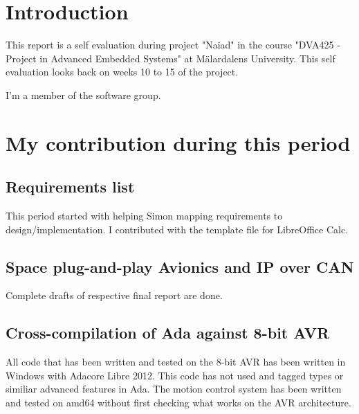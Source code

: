 \section{Introduction}
This report is a self evaluation during project "Naiad" in the course
"DVA425 - Project in Advanced Embedded Systems" at M\"{a}lardalens University.
This self evaluation looks back on weeks 10 to 15 of the project.

I'm a member of the software group.

\section{My contribution during this period}

\subsection{Requirements list}
This period started with helping Simon mapping requirements to
design/implementation. I contributed with the template file for LibreOffice
Calc.

\subsection{Space plug-and-play Avionics and IP over CAN}
Complete drafts of respective final report are done.

\subsection{Cross-compilation of Ada against 8-bit AVR}
All code that has been written and tested on the 8-bit AVR has been written in
Windows with Adacore Libre 2012. This code has not used and tagged types or
similiar advanced features in Ada. The motion control system has been
written and tested on amd64 without first checking what works on the AVR
architecture.

